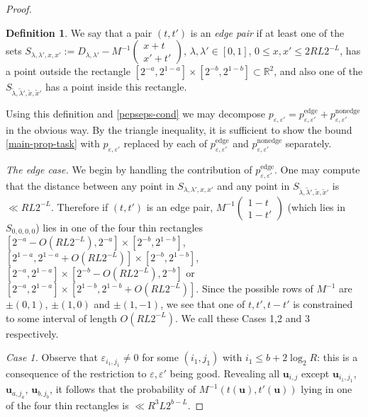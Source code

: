 \documentclass[11pt,reqno]{amsart}
\numberwithin{equation}{section}
\theoremstyle{definition}
\newtheorem{definition}[theorem]{Definition}
\theoremstyle{remark}
\newcommand{\mbf}{\mathbf}
\newcommand\edge{\operatorname{edge}}
\newcommand\nonedge{\operatorname{nonedge}}
\newcommand{\eps}{\varepsilon}
\renewcommand{\le}{\leqslant}
\newcommand\R{\mathbb{R}}
\begin{document}
\begin{proof}
\begin{definition} We say that a pair $(t,t')$ is an \emph{edge pair} if at least one of the sets $S_{\lambda,\lambda', x, x'} := D_{\lambda,\lambda'} - M^{-1}\left(\begin{smallmatrix} x + t \\ x' + t'\end{smallmatrix}\right)$, $\lambda,\lambda' \in [0,1]$, $0 \le x, x' \le 2RL2^{-L}$, has a point outside the rectangle $[2^{-a}, 2^{1 - a}] \times [2^{-b},2^{1 - b}] \subset \R^2$, and also one of the $S_{\tilde\lambda,\tilde\lambda',\tilde x,\tilde x'}$ has a point inside this rectangle.\end{definition} 
Using this definition and \cref{pepseps-cond} we may decompose $p_{\eps,\eps'} = p_{\eps,\eps'}^{\edge} + p_{\eps,\eps'}^{\nonedge}$ in the obvious way. By the triangle inequality, it is sufficient to show the bound \cref{main-prop-task} with $p_{\eps,\eps'}$ replaced by each of $p_{\eps,\eps'}^{\edge}$ and $p_{\eps,\eps'}^{\nonedge}$ separately.\vspace*{8pt}

\emph{The edge case.} We begin by handling the contribution of $p_{\eps,\eps'}^{\edge}$. One may compute that the distance between any point in $S_{\lambda,\lambda',x,x'}$ and any point in $S_{\tilde\lambda,\tilde\lambda', \tilde x, \tilde x'}$ is $\ll RL 2^{-L}$. Therefore if $(t,t')$ is an edge pair, $M^{-1}\left(\begin{smallmatrix} 1-t \\  1-t'\end{smallmatrix}\right)$ (which lies in $S_{0,0,0,0}$) lies in one of the four thin rectangles $[2^{-a} - O(RL 2^{-L}), 2^{-a}] \times [2^{-b}, 2^{1 - b}]$, $[2^{1 - a} , 2^{1-a} + O(RL 2^{-L})] \times [2^{-b}, 2^{1 - b}]$, $[2^{-a}, 2^{1 - a}] \times [2^{-b} -  O(RL 2^{-L}), 2^{-b}]$ or $[2^{-a}, 2^{1 - a}] \times [2^{1-b}, 2^{1 - b} + O(RL 2^{-L})]$. Since the possible rows of $M^{-1}$ are $\pm (0,1)$, $\pm (1,0)$ and $\pm (1, -1)$, we see that one of $t, t', t - t'$ is constrained to some interval of length $O(RL 2^{-L})$. We call these Cases 1,2 and 3 respectively.

\emph{Case 1.} Observe that $\eps_{i_1,j_1} \ne 0$ for some $(i_1, j_1)$ with $i_1 \le b + 2\log_2 R$: this is a consequence of the restriction to $\eps, \eps'$ being good. Revealing all $\mbf{u}_{i,j}$ except $\mbf{u}_{i_1, j_1}$, $\mbf{u}_{a, j_a}$, $\mbf{u}_{b,j_b}$, it follows that the probability of $M^{-1}(t(\mbf{u}), t'(\mbf{u}))$ lying in one of the four thin rectangles is $\ll R^3L 2^{b - L}$.


\end{proof}
\end{document}
